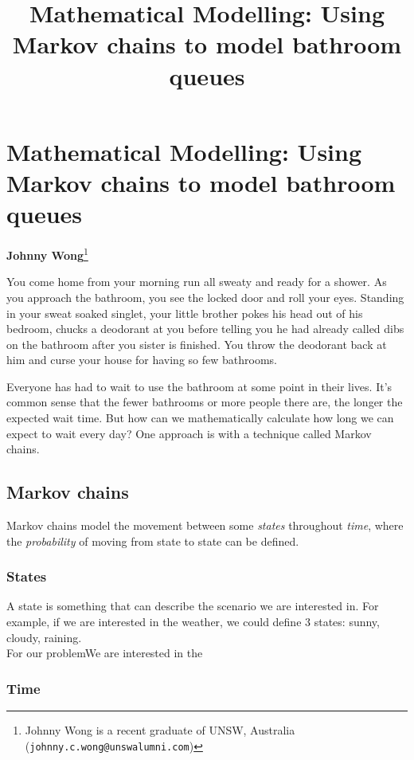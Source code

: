 \section*{Mathematical Modelling: Using Markov chains to model bathroom queues}
\vspace{-.30cm}

\title{Mathematical Modelling: Using Markov chains to model bathroom queues}

\begin{center}
	\textbf{Johnny Wong}\footnote{%
		Johnny Wong is a recent graduate of UNSW, Australia ({\tt johnny.c.wong@unswalumni.com})}
\end{center}

\vspace{5mm}

You come home from your morning run all sweaty and ready for a shower. As you approach the bathroom, you see the locked door and roll your eyes. Standing in your sweat soaked singlet, your little brother pokes his head out of his bedroom, chucks a deodorant at you before telling you he had already called dibs on the bathroom after you sister is finished. You throw the deodorant back at him and curse your house for having so few bathrooms.

Everyone has had to wait to use the bathroom at some point in their lives. It's common sense that the fewer bathrooms or more people there are, the longer the expected wait time. But how can we mathematically calculate how long we can expect to wait every day? One approach is with a technique called Markov chains.

\subsection*{Markov chains}
Markov chains model the movement between some \textit{states} throughout \textit{time}, where the \textit{probability} of moving from state to state can be defined.

\subsubsection*{States}
A state is something that can describe the scenario we are interested in. For example, if we are interested in the weather, we could define 3 states: sunny, cloudy, raining.\\
For our problemWe are interested in the 

\subsubsection*{Time}
